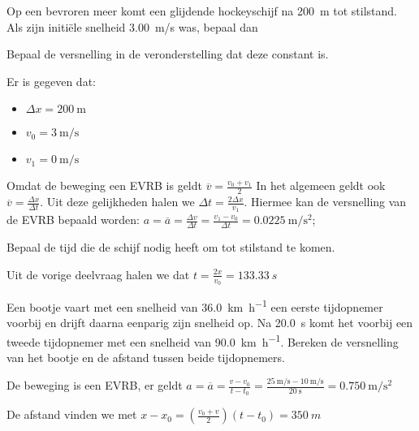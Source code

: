 \documentclass{ximera}
\begin{document}
\begin{exercise}
    Op een bevroren meer komt een glijdende hockeyschijf na \SI{200}{m} tot stilstand. Als zijn initi\"ele snelheid \SI{3,00}{m/s} was, bepaal dan
    \begin{question} Bepaal de versnelling in de veronderstelling dat deze constant is. 
        \begin{oplossing} 
        Er is gegeven dat: 
        \begin{itemize}
            \item \(\Delta x = \SI{200}{\meter}\)
            \item \(v_0 = \SI{3}{\meter\per\second}\)
            \item \(v_1 = \SI{0}{\meter\per\second}\)
        \end{itemize}
        Omdat de beweging een EVRB is geldt \(\overline{v} = \frac{v_0 + v_1}{2}\) In het algemeen geldt ook \(\overline{v} = \frac{\Delta x}{\Delta t}\). Uit deze gelijkheden halen we \(\Delta t = \frac{2\Delta x}{v_1}\). Hiermee kan de versnelling van de EVRB bepaald worden: 
        $a= \overline{a} = \frac{\Delta v}{\Delta t} = \frac{v_1 - v_0}{\Delta t}=\SI{0.0225}{\meter\per\second\squared}$;    
        \end{oplossing} 
    \end{question}
    
    \begin{question} Bepaal de tijd die de schijf nodig heeft om tot stilstand te komen. 
    \begin{oplossing} 
    Uit de vorige deelvraag halen we dat $t=\frac{2x}{v_0}=\SI{133,33}{s}$                                
    \end{oplossing} 
    \end{question}

\end{exercise}

\begin{exercise}
    Een bootje vaart met een snelheid van \SI{36,0}{\kilo\meter\per\hour} een eerste tijdopnemer voorbij en drijft daarna eenparig zijn snelheid op. Na \SI{20,0}{\second} komt het voorbij een tweede tijdopnemer met een snelheid van \SI{90,0}{\kilo\meter\per\hour}. Bereken de versnelling van het bootje en de afstand tussen beide tijdopnemers.
    \begin{oplossing}
    De beweging is een EVRB, er geldt $a= \overline{a} = \frac{v-v_0}{t-t_0}= \frac{\SI{25}{\meter\per\second} - \SI{10}{\meter\per\second}}{\SI{20}{\second}} = \SI{0,750}{\meter\per\second\squared} $
        
        
    De afstand vinden we met $x-x_0=\left(\frac{v_0+v}{2}\right)(t-t_0)=\SI{350}{m}$
    \end{oplossing}
\end{exercise}
\end{document}
